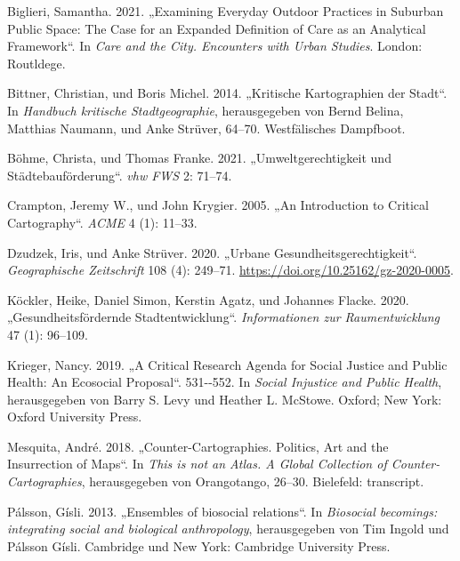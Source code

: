 \documentclass[
  ngerman,
]{article}
\newlength{\cslhangindent}
\newlength{\cslentryspacingunit} %
\newenvironment{CSLReferences}[2] %
 {%
  \setlength{\parindent}{0pt}
  \ifodd #1
  \let\oldpar\par
  \def\par{\hangindent=\cslhangindent\oldpar}
  \fi
  \setlength{\parskip}{#2\cslentryspacingunit}
 }%
 {}
\begin{document}
\begin{CSLReferences}{1}{0}
\leavevmode{}%
Biglieri, Samantha. 2021. {„Examining Everyday Outdoor Practices in Suburban Public Space: The Case for an Expanded Definition of Care as an Analytical Framework``}. In \emph{Care and the City. Encounters with Urban Studies}. London: Routldege.

\leavevmode{}%
Bittner, Christian, und Boris Michel. 2014. {„Kritische Kartographien der Stadt``}. In \emph{Handbuch kritische Stadtgeographie}, herausgegeben von Bernd Belina, Matthias Naumann, und Anke Strüver, 64--70. {Westf{ä}lisches Dampfboot}.

\leavevmode{}%
Böhme, Christa, und Thomas Franke. 2021. {„Umweltgerechtigkeit und St{ä}dtebauf{ö}rderung``}. \emph{vhw FWS} 2: 71--74.

\leavevmode{}%
Crampton, Jeremy W., und John Krygier. 2005. {„An Introduction to Critical Cartography``}. \emph{ACME} 4 (1): 11--33.

\leavevmode{}%
Dzudzek, Iris, und Anke Strüver. 2020. {„Urbane Gesundheitsgerechtigkeit``}. \emph{Geographische Zeitschrift} 108 (4): 249--71. \url{https://doi.org/10.25162/gz-2020-0005}.

\leavevmode{}%
Köckler, Heike, Daniel Simon, Kerstin Agatz, und Johannes Flacke. 2020. {„Gesundheitsf{ö}rdernde Stadtentwicklung``}. \emph{Informationen zur Raumentwicklung} 47 (1): 96--109.

\leavevmode{}%
Krieger, Nancy. 2019. {„A Critical Research Agenda for Social Justice and Public Health: An Ecosocial Proposal``}. 531-\/-552. In \emph{Social Injustice and Public Health}, herausgegeben von Barry S. Levy und Heather L. McStowe. Oxford; New York: Oxford University Press.

\leavevmode{}%
Mesquita, André. 2018. {„Counter-Cartographies. Politics, Art and the Insurrection of Maps``}. In \emph{This is not an Atlas. A Global Collection of Counter-Cartographies}, herausgegeben von Orangotango, 26--30. Bielefeld: transcript.

\leavevmode{}%
Pálsson, Gísli. 2013. {„Ensembles of biosocial relations``}. In \emph{Biosocial becomings: integrating social and biological anthropology}, herausgegeben von Tim Ingold und Pálsson Gísli. Cambridge und New York: {Cambridge University Press}.


\end{CSLReferences}
\end{document}
